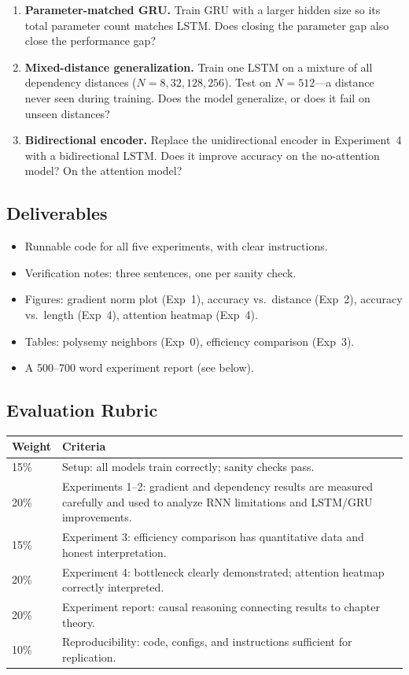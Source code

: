 \begin{enumerate}
    \item \tierstretch{} \textbf{Parameter-matched GRU.} Train GRU with a larger hidden size so its total parameter count matches LSTM. Does closing the parameter gap also close the performance gap?
    \item \tierstretch{} \textbf{Mixed-distance generalization.} Train one LSTM on a mixture of all dependency distances ($N = 8, 32, 128, 256$). Test on $N = 512$---a distance never seen during training. Does the model generalize, or does it fail on unseen distances?
    \item \tierstretch{} \textbf{Bidirectional encoder.} Replace the unidirectional encoder in Experiment~4 with a bidirectional LSTM. Does it improve accuracy on the no-attention model? On the attention model?
\end{enumerate}

\subsection*{Deliverables}

\begin{itemize}[nosep]
    \item Runnable code for all five experiments, with clear instructions.
    \item Verification notes: three sentences, one per sanity check.
    \item Figures: gradient norm plot (Exp~1), accuracy vs.\ distance (Exp~2), accuracy vs.\ length (Exp~4), attention heatmap (Exp~4).
    \item Tables: polysemy neighbors (Exp~0), efficiency comparison (Exp~3).
    \item A 500--700 word experiment report (see below).
\end{itemize}

\subsection*{Evaluation Rubric}

\begin{center}
\begin{tabular}{lp{}}
\toprule
Weight & Criteria \\
\midrule
15\% & Setup: all models train correctly; sanity checks pass. \\
20\% & Experiments 1--2: gradient and dependency results are measured carefully and used to analyze RNN limitations and LSTM/GRU improvements. \\
15\% & Experiment 3: efficiency comparison has quantitative data and honest interpretation. \\
20\% & Experiment 4: bottleneck clearly demonstrated; attention heatmap correctly interpreted. \\
20\% & Experiment report: causal reasoning connecting results to chapter theory. \\
10\% & Reproducibility: code, configs, and instructions sufficient for replication. \\
\bottomrule
\end{tabular}
\end{center}

